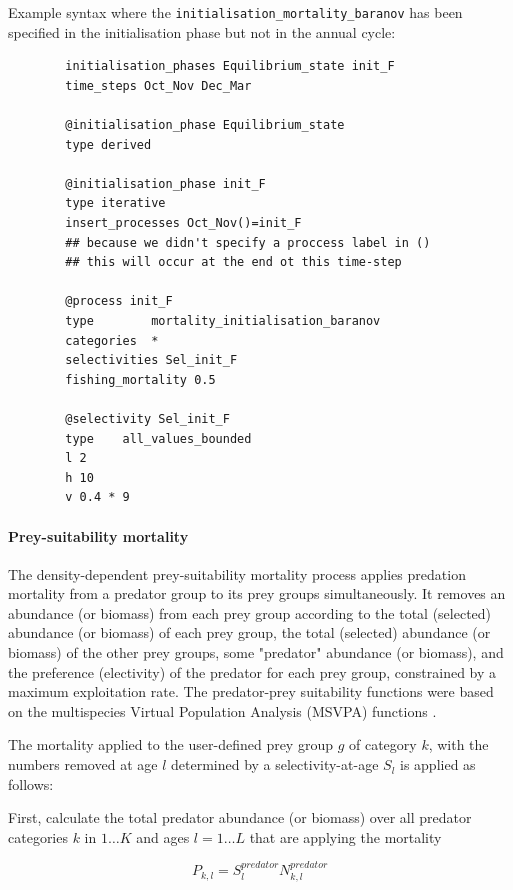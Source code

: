 Example syntax where the \texttt{initialisation\_mortality\_baranov} has been specified in the initialisation phase but not in the annual cycle:

{\small{\begin{verbatim}
		initialisation_phases Equilibrium_state init_F
		time_steps Oct_Nov Dec_Mar
		
		@initialisation_phase Equilibrium_state
		type derived
		
		@initialisation_phase init_F
		type iterative
		insert_processes Oct_Nov()=init_F 
		## because we didn't specify a proccess label in ()
		## this will occur at the end ot this time-step
		
		@process init_F
		type 		mortality_initialisation_baranov
		categories	*
		selectivities Sel_init_F
		fishing_mortality 0.5
		
		@selectivity Sel_init_F
		type 	all_values_bounded 
		l 2
		h 10
		v 0.4 * 9
		\end{verbatim}}}

\paragraph{Prey-suitability mortality}\label{sec:Process-MortalityPreySuitability} 

The density-dependent prey-suitability mortality process applies predation mortality from a predator group to its prey groups simultaneously. It removes an abundance (or biomass) from each prey group according to the total (selected) abundance (or biomass) of each prey group, the total (selected) abundance (or biomass) of the other prey groups, some "predator" abundance (or biomass), and the preference (electivity) of the predator for each prey group, constrained by a maximum exploitation rate. The predator-prey suitability functions were based on the multispecies Virtual Population Analysis (MSVPA) functions \citep{JuradoMolina2005}.

The mortality applied to the user-defined prey group $g$ of category $k$, with the numbers removed at age $l$ determined by a selectivity-at-age $S_l$ is applied as follows:

First, calculate the total predator abundance (or biomass) over all predator categories $k$ in $1 \ldots K$ and ages $l = 1 \ldots L$ that are applying the mortality

\begin{equation}
P_{k,l} = S^{predator}_l N^{predator}_{k,l}
\end{equation}

